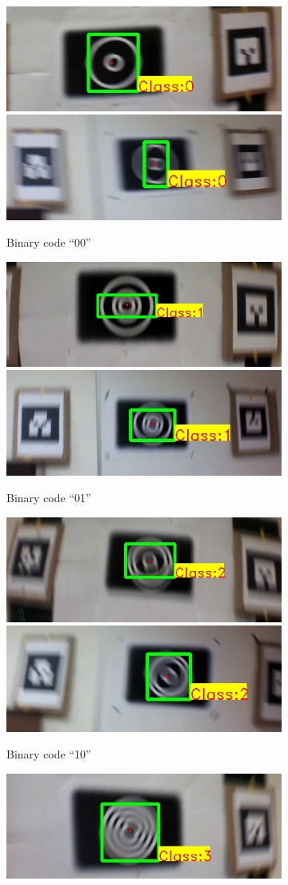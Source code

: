 \documentclass[runningheads]{llncs}
\begin{document}
\begin{figure}[hb!]
\begin{subfigure}{\textwidth}
\centering
  \includegraphics[width=0.4\linewidth]{output_00.jpg}
  \includegraphics[width=0.4\linewidth]{new_results/output_00.jpg}
  \caption{Binary code ``00''}
  \label{fig:output0}
\end{subfigure}
\begin{subfigure}{\textwidth}
\centering
  \includegraphics[width=0.4\linewidth]{output_01.jpg}
  \includegraphics[width=0.4\linewidth]{new_results/output_01.jpg}
  \caption{Binary code ``01''}
  \label{fig:output1}
\end{subfigure}
\begin{subfigure}{\textwidth}
\centering
  \includegraphics[width=0.4\linewidth]{output_10.jpg}
  \includegraphics[width=0.4\linewidth]{new_results/output_10.jpg}
  \caption{Binary code ``10''}
  \label{fig:output2}
\end{subfigure}
\begin{subfigure}{\textwidth}
\centering
  \includegraphics[width=0.4\linewidth]{output_11.jpg}

\end{subfigure}
\end{figure}
\end{document}
